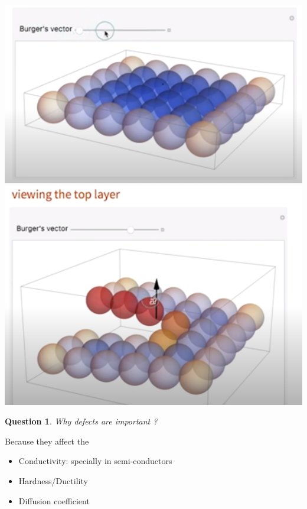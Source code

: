 \documentclass[13]{article}
\newtheorem{exer}{Question}
\begin{document}
\begin{center}
\includegraphics[scale=0.5]{figures/14.png} \includegraphics[scale=0.5]{figures/15.png}
\end{center}
\begin{exer}
Why defects are important ?
\end{exer}
Because they affect the 
\begin{itemize}

\item Conductivity: specially in semi-conductors 
\item Hardness/Ductility
\item Diffusion coefficient

\end{itemize}
\end{document}
